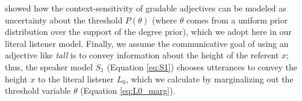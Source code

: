 \documentclass[doc]{apa6}
\begin{document}
 showed how the context-sensitivity of gradable adjectives can be modeled as uncertainty about the threshold $P(\theta)$ (where $\theta$ comes from a uniform prior distribution over the support of the degree prior), which we adopt here in our literal listener model. 
Finally, we assume the communicative goal of using an adjective like \emph{tall} is to convey information about the height of the referent $x$; thus, the speaker model $S_1$ (Equation \ref{eq:S1}) chooses utterances to convey the height $x$ to the literal listener $L_0$, which we calculate by marginalizing out the threshold variable $\theta$ (Equation \ref{eq:L0_marg}).
  
\end{document}

